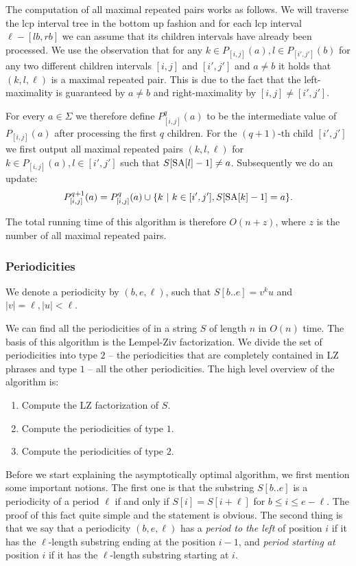 The computation of all maximal repeated pairs works as follows.
We will traverse the lcp interval tree in the bottom up fashion and for each lcp interval $\ell - [lb, rb]$ we can assume that its children intervals have already been processed.
We use the observation that for any $k \in P_{[i,j]}(a), l \in P_{[i',j']}(b)$ for any two different children intervals $[i,j]$ and $[i',j']$ and $a \neq b$ it holds that $(k, l, \ell)$ is a maximal repeated pair.
This is due to the fact that the left-maximality is guaranteed by $a \neq b$ and right-maximality by $[i,j] \neq [i', j']$.

For every $a \in \Sigma$ we therefore define $P_{[i,j]}^q(a)$ to be the intermediate value of $P_{[i,j]}(a)$ after processing the first $q$ children.
For the $(q+1)$-th child $[i',j']$ we first output all maximal repeated pairs $(k,l,\ell)$ for $k \in P_{[i,j]}(a), l \in [i', j']$ such that $S[\text{SA}[l] - 1] \neq a$.
Subsequently we do an update: $$P_{[i,j]}^{q+1}(a) = P_{[i,j]}^{q}(a) \cup \{ k ~|~  k \in [i', j'], S[\text{SA}[k] - 1] = a \}.$$

The total running time of this algorithm is therefore $O(n+z)$, where $z$ is the number of all maximal repeated pairs.

\hypertarget{periodicities}{%
\subsubsection{Periodicities}\label{periodicities}}

We denote a periodicity by $(b,e,\ell)$, such that $S[b..e] = v^ku$ and $|v| = \ell, |u| < \ell$.

We can find all the periodicities of in a string $S$ of length $n$ in $O(n)$ time.
The basis of this algorithm is the Lempel-Ziv factorization.
We divide the set of periodicities into type $2$ -- the periodicities that are completely contained in LZ phrases and type $1$ -- all the other periodicities.
The high level overview of the algorithm is:
\begin{enumerate}
    \item Compute the LZ factorization of $S$.
    \item Compute the periodicities of type $1$.
    \item Compute the periodicities of type $2$.
\end{enumerate}

Before we start explaining the asymptotically optimal algorithm, we first mention some important notions.
The first one is that the substring $S[b..e]$ is a periodicity of a period $\ell$ if and only if $S[i] = S[i+\ell]$ for $b \leq i \leq e-\ell$.
The proof of this fact quite simple and the statement is obvious.
The second thing is that we say that a periodicity $(b,e,\ell)$ has a \textit{period to the left} of position $i$ if it has the $\ell$-length substring ending at the position $i-1$, and \textit{period starting at} position $i$ if it has the $\ell$-length substring starting at $i$.

